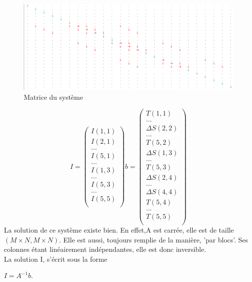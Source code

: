 \begin{figure}[!htb]
\includegraphics[scale=0.5]{Images/matrice.png}
\caption{Matrice du système}
\end{figure}
\begin{equation}
I = 
\begin{pmatrix}
I(1,1)\\
I(2,1)\\
...\\
I(5,1)\\
...\\
I(1,3)\\
...\\
I(5,3)\\
...\\
I(5,5)\\
\end{pmatrix}
b = 
\begin{pmatrix}
T(1,1)\\
...\\
\Delta S(2,2)\\
...\\
T(5,2)\\
\Delta S(1,3)\\
...\\
T(5,3)\\
\Delta S(2,4)\\
...\\
\Delta S(4,4)\\
T(5,4)\\
...\\
T(5,5)\\
\end{pmatrix}
\end{equation}
La solution de ce système existe bien. En effet,A est carrée, elle est de taille $\left(M\times N, M \times N\right)$. Elle est aussi, toujours remplie de la manière, 'par blocs'. Ses colonnes étant linéairement indépendantes, elle est donc inversible.\\
La solution I, s'écrit sous la forme
\begin{center}
$I = A^{-1}b$.
\end{center} 
